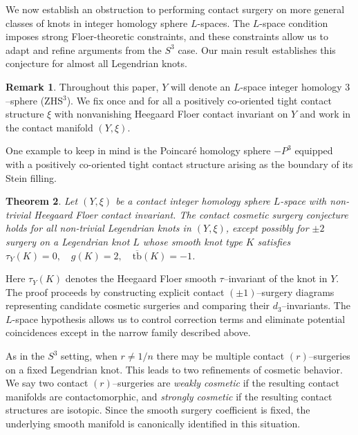 \documentclass[12pt]{amsart}
\newtheorem{theorem}{Theorem}[section]
\theoremstyle{definition}
\newtheorem{remark} [theorem] {Remark}
\theoremstyle{definition}
\newcommand{\tb}{\text{tb}}
\begin{document}
We now establish an obstruction to performing contact surgery on more general classes of knots in integer homology sphere $L$-spaces. The $L$-space condition imposes strong Floer-theoretic constraints, and these constraints allow us to adapt and refine arguments from the $S^3$ case. Our main result establishes this conjecture for almost all Legendrian knots.
\begin{remark}
    
Throughout this paper, $Y$ will denote an $L$-space integer homology $3$–sphere (ZHS$^3$). We fix once and for all a positively co-oriented tight contact structure $\xi$ with nonvanishing Heegaard Floer contact invariant on $Y$ and work in the contact manifold $(Y,\xi)$. 


One example to keep in mind is the Poincar\'e homology sphere $-P^3$ equipped with a positively co-oriented tight contact structure arising as the boundary of its Stein filling.
\end{remark}

\begin{theorem}\label{contactcosmeticthm}
Let $(Y,\xi)$ be a contact integer homology sphere $L$-space with non-trivial Heegaard Floer contact invariant. The contact cosmetic surgery conjecture holds for all non-trivial Legendrian knots in $(Y,\xi)$, except possibly for $\pm 2$ surgery on a Legendrian knot $L$ whose smooth knot type $K$ satisfies
$\tau_Y(K)=0, \quad g(K)=2, \quad \overline{\tb}(K)=-1$. 
\end{theorem}

Here $\tau_Y(K)$ denotes the Heegaard Floer smooth $\tau$–invariant of the knot in $Y$. The proof proceeds by constructing explicit contact $(\pm1)$–surgery diagrams representing candidate cosmetic surgeries and comparing their $d_3$–invariants. The $L$-space hypothesis allows us to control correction terms and eliminate potential coincidences except in the narrow family described above.

As in the $S^3$ setting, when $r \neq 1/n$ there may be multiple contact $(r)$–surgeries on a fixed Legendrian knot. This leads to two refinements of cosmetic behavior. We say two contact $(r)$–surgeries are \textit{weakly cosmetic} if the resulting contact manifolds are contactomorphic, and \textit{strongly cosmetic} if the resulting contact structures are isotopic. Since the smooth surgery coefficient is fixed, the underlying smooth manifold is canonically identified in this situation.
\end{document}
